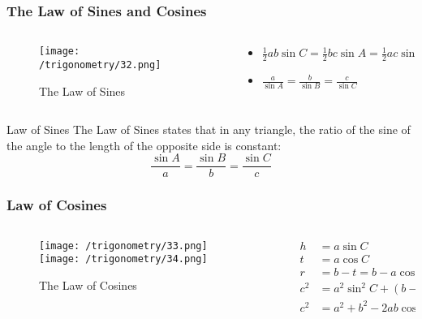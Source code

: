 \documentclass{beamer}
\begin{document}
    \begin{frame}
    \frametitle{The Law of Sines and Cosines} 
    \begin{columns}
        \begin{column}{0.5\textwidth}
            \begin{figure}
                \centering
                \texttt{[image: /trigonometry/32.png]}
                \caption{The Law of Sines}
            \end{figure}
        \end{column}
        \begin{column}{0.5\textwidth}
            \begin{itemize}
                \item \( \frac{1}{2} ab \sin C = \frac{1}{2}bc\sin A = \frac{1}{2}ac\sin B\)
                \item \( \frac{a}{\sin A} = \frac{b}{\sin B} = \frac{c}{\sin C}\)
            \end{itemize}
        \end{column}
    \end{columns}
    \begin{block}{Law of Sines}
        The Law of Sines states that in any triangle, the ratio of the sine of the angle to the length of the opposite side is constant:
        \[
        \frac{\sin A}{a} = \frac{\sin B}{b} = \frac{\sin C}{c}
        \]
    \end{block}
    \end{frame}

    \begin{frame}
        \frametitle{Law of Cosines}
        \begin{columns}
            \begin{column}{0.5\textwidth}
                \begin{figure}
                    \centering
                    \texttt{[image: /trigonometry/33.png]}
                    \texttt{[image: /trigonometry/34.png]}
                    \caption{The Law of Cosines}
                \end{figure}
            \end{column}
            \begin{column}{0.5\textwidth}
                \begin{align}
                    h &= a\sin C\\
                    t &= a \cos C \\
                    r &= b - t = b - a \cos C \\
                    c^2  &= a^2 \sin^2 C + (b - a \cos C)^2 \\
                    c^2 &= a^2 + b^2 - 2ab \cos C 
                \end{align}
                \end{column}
        \end{columns}
    \end{frame}
\end{document}
